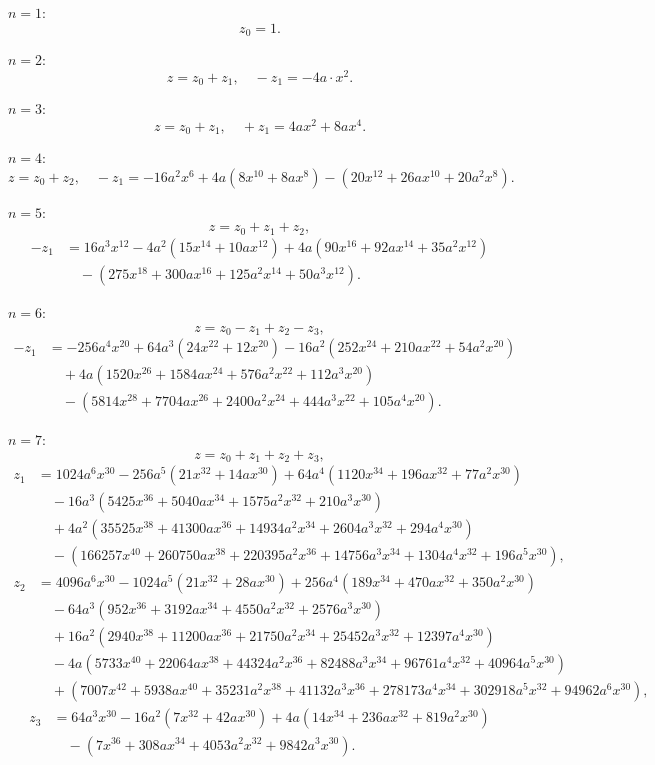 \documentclass[11pt,a4paper]{book}
\begin{document}
$n = 1$:
\[z_0 = 1.\]

$n = 2$:
\[z = z_0 + z_1, \quad -z_1 = -4a \cdot x^2.\]

$n = 3$:
\[z = z_0 + z_1, \quad +z_1 = 4ax^2 + 8ax^4.\]

$n = 4$:
\[z = z_0 + z_2, \quad -z_1 = -16a^2 x^6 + 4a(8x^{10} + 8ax^8) - (20x^{12} + 26ax^{10} + 20a^2x^8).\]

$n = 5$:
\[z = z_0 + z_1 + z_2,\]
\begin{align*}
-z_1 &= 16a^3 x^{12} - 4a^2(15x^{14} + 10ax^{12}) + 4a(90x^{16} + 92ax^{14} + 35a^2x^{12}) \\
&\quad - (275x^{18} + 300ax^{16} + 125a^2x^{14} + 50a^3x^{12}).
\end{align*}

$n = 6$:
\[z = z_0 - z_1 + z_2 - z_3,\]
\begin{align*}
-z_1 &= -256a^4 x^{20} + 64a^3(24x^{22} + 12x^{20}) - 16a^2(252x^{24} + 210ax^{22} + 54a^2x^{20}) \\
&\quad + 4a(1520x^{26} + 1584ax^{24} + 576a^2x^{22} + 112a^3x^{20}) \\
&\quad - (5814x^{28} + 7704ax^{26} + 2400a^2x^{24} + 444a^3x^{22} + 105a^4x^{20}).
\end{align*}

$n = 7$:
\[z = z_0 + z_1 + z_2 + z_3,\]
\begin{align*}
z_1 &= 1024a^6 x^{30} - 256a^5(21x^{32} + 14ax^{30}) + 64a^4(1120x^{34} + 196ax^{32} + 77a^2x^{30}) \\
&\quad - 16a^3(5425x^{36} + 5040ax^{34} + 1575a^2x^{32} + 210a^3x^{30}) \\
&\quad + 4a^2(35525x^{38} + 41300ax^{36} + 14934a^2x^{34} + 2604a^3x^{32} + 294a^4x^{30}) \\
&\quad - (166257x^{40} + 260750ax^{38} + 220395a^2x^{36} + 14756a^3x^{34} + 1304a^4x^{32} + 196a^5x^{30}),
\end{align*}
\begin{align*}
z_2 &= 4096a^6 x^{30} - 1024a^5(21x^{32} + 28ax^{30}) + 256a^4(189x^{34} + 470ax^{32} + 350a^2x^{30}) \\
&\quad - 64a^3(952x^{36} + 3192ax^{34} + 4550a^2x^{32} + 2576a^3x^{30}) \\
&\quad + 16a^2(2940x^{38} + 11200ax^{36} + 21750a^2x^{34} + 25452a^3x^{32} + 12397a^4x^{30}) \\
&\quad - 4a(5733x^{40} + 22064ax^{38} + 44324a^2x^{36} + 82488a^3x^{34} + 96761a^4x^{32} + 40964a^5x^{30}) \\
&\quad + (7007x^{42} + 5938ax^{40} + 35231a^2x^{38} + 41132a^3x^{36} + 278173a^4x^{34} + 302918a^5x^{32} + 94962a^6x^{30}),
\end{align*}
\begin{align*}
z_3 &= 64a^3 x^{30} - 16a^2(7x^{32} + 42ax^{30}) + 4a(14x^{34} + 236ax^{32} + 819a^2x^{30}) \\
&\quad - (7x^{36} + 308ax^{34} + 4053a^2x^{32} + 9842a^3x^{30}).
\end{align*}
\end{document}
